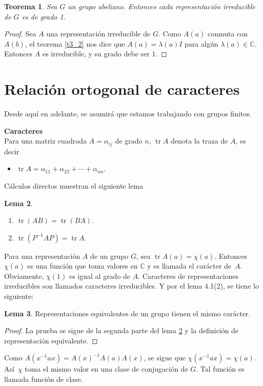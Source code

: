 \documentclass[12pt]{book}
\DeclareMathOperator{\tr}{tr}
\newtheorem{theorem}{Teorema}[section]
\theoremstyle{definition}
\newtheorem{lemma}[theorem]{Lema}
\newcounter{in}
\newcounter{ini}
\begin{document}
\begin{theorem}
  \label{t3_3}
  Sea $G$ un grupo abeliano. Entonces cada
representación irreducible de $G$ es de grado 1.
\end{theorem}

\begin{proof}
  Sea $A$ una representación irreducible de $G$. Como $A(a)$ conmuta
  con $A(b)$, el teorema \ref{t3_2} nos dice que $A(a)=\lambda(a) I$ para
  algún $\lambda(a) \in \mathbb{C}$. Entonces $A$ es irreducible, y su
  grado debe ser $1$.
\end{proof}

\section{Relación ortogonal de caracteres}
\label{sec:roc}
Desde aquí en adelante, se asumirá que estamos trabajando con grupos
finitos.

\textbf{Caracteres}\\
Para una matriz cuadrada $A=\alpha_{ij}$ de grado
$n$, $\tr A$ denota la traza de $A$, es decir
\begin{itemize}
  \item $\tr A= \alpha_{11}+ \alpha_{22} + \cdots + \alpha_{nn}$.
  \end{itemize}

Cálculos directos muestran el siguiente lema

\begin{lemma}
   \label{l4_1}
  \begin{enumerate} Para alguna matriz no singular $P$, se sigue que:
  \item $\tr (AB)=\tr (BA) $.
  \item $\tr (P^{-1}AP)=\tr A$.
  \end{enumerate}
\end{lemma}

Para una representación $A$ de un grupo $G$, sea
$\tr A(a)=\chi(a)$. Entonces~$\chi(a)$ es una función que toma valores
en $\mathbb{C}$ y es llamada el carácter de~$A$. Obviamente, $\chi(1)$
es igual al grado de $A$. Caracteres de representaciones irreducibles
son llamados caracteres irreducibles. Y por el lema 4.1(2), se tiene
lo siguiente:

\begin{lemma}
  \label{l4_2}
  Representaciones equivalentes de un grupo tienen el mismo carácter.
\end{lemma}
\begin{proof}
  La prueba se sigue de la segunda parte del lema \ref{l4_1} y la
  definición de representación equivalente.
\end{proof}
Como $A(x^{-1}ax)=A(x)^{-1}A(a)A(x)$, se sigue que
$ \chi(x^{-1}ax)=\chi(a)$. Así~$\chi$ toma el mismo valor en una clase
de conjugación de $G$. Tal función es llamada función de clase.
\end{document}
